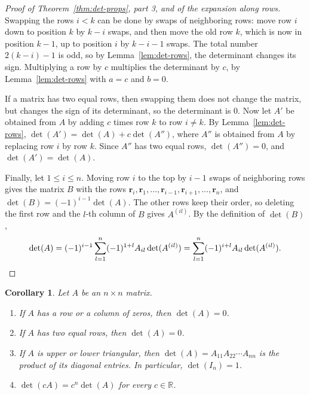 \documentclass[11pt]{article}
\theoremstyle{definition}
\theoremstyle{plain}
\newtheorem{corollary}[definition]{Corollary}
\theoremstyle{remark}
\begin{document}
\begin{proof}[Proof of Theorem~\ref{thm:det-props}, part 3, and of the expansion along rows]
    Swapping the rows $i < k$ can be done by swaps of neighboring rows: move row $i$ down to position $k$ by $k - i$ swaps, and then move the old row $k$, which is now in position $k - 1$, up to position $i$ by $k - i - 1$ swaps. The total number $2(k - i) - 1$ is odd, so by Lemma~\ref{lem:det-rows}, the determinant changes its sign. Multiplying a row by $c$ multiplies the determinant by $c$, by Lemma~\ref{lem:det-rows} with $a = c$ and $b = 0$.

    If a matrix has two equal rows, then swapping them does not change the matrix, but changes the sign of its determinant, so the determinant is $0$. Now let $A'$ be obtained from $A$ by adding $c$ times row $k$ to row $i \neq k$. By Lemma~\ref{lem:det-rows}, $\det(A') = \det(A) + c\det(A'')$, where $A''$ is obtained from $A$ by replacing row $i$ by row $k$. Since $A''$ has two equal rows, $\det(A'') = 0$, and $\det(A') = \det(A)$.

    Finally, let $1 \leq i \leq n$. Moving row $i$ to the top by $i - 1$ swaps of neighboring rows gives the matrix $B$ with the rows $\mathbf{r}_i, \mathbf{r}_1, \ldots, \mathbf{r}_{i-1}, \mathbf{r}_{i+1}, \ldots, \mathbf{r}_n$, and $\det(B) = (-1)^{i-1}\det(A)$. The other rows keep their order, so deleting the first row and the $l$-th column of $B$ gives $A^{(il)}$. By the definition of $\det(B)$,
    \[\det(A) = (-1)^{i-1}\sum_{l=1}^n (-1)^{1+l} A_{il}\det(A^{(il)}) = \sum_{l=1}^n (-1)^{i+l} A_{il}\det(A^{(il)}). \qedhere\]
\end{proof}

\begin{corollary}\label{cor:det-easy}
    Let $A$ be an $n \times n$ matrix.
    \begin{enumerate}
        \item If $A$ has a row or a column of zeros, then $\det(A) = 0$.
        \item If $A$ has two equal rows, then $\det(A) = 0$.
        \item If $A$ is upper or lower triangular, then $\det(A) = A_{11} A_{22} \cdots A_{nn}$ is the product of its diagonal entries. In particular, $\det(I_n) = 1$.
        \item $\det(cA) = c^n \det(A)$ for every $c \in \mathbb{R}$.
    \end{enumerate}
\end{corollary}
\end{document}
